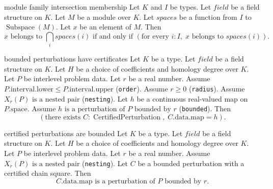 \begin{cleanresult}{module family intersection membership}
Let $K$ and $I$ be types.
Let $\mathit{field}$ be a field structure on $K$.
Let $M$ be a module over $K$.
Let $\mathit{spaces}$ be a function from $I$ to $\operatorname{Subspace}(M)$.
Let $x$ be an element of $M$.
Then \[x\text{ belongs to }\bigcap_i \mathit{spaces}(i)\text{ if and only if }\left(\text{for every }i : I,\; x\text{ belongs to }\mathit{spaces}(i)\right).\]
\par{}
\end{cleanresult}

\begin{cleanresult}{bounded perturbations have certificates}
Let $K$ be a type.
Let $\mathit{field}$ be a field structure on $K$.
Let $H$ be a choice of coefficients and homology degree over $K$.
Let $P$ be interlevel problem data.
Let $r$ be a real number.
Assume $P.\mathrm{interval}.\mathrm{lower}\le P.\mathrm{interval}.\mathrm{upper}$ (\texttt{order}).
Assume $r\ge 0$ (\texttt{radius}).
Assume $X_{r}(P)\text{ is a nested pair}$ (\texttt{nesting}).
Let $h$ be a continuous real-valued map on $P.\mathrm{space}$.
Assume $h\text{ is a perturbation of }P\text{ bounded by }r$ (\texttt{bounded}).
Then \[\left(\text{there exists }C : \operatorname{CertifiedPerturbation},\; C.\mathrm{data}.\mathrm{map}=h\right).\]
\par{}
\end{cleanresult}

\begin{cleanresult}{certified perturbations are bounded}
Let $K$ be a type.
Let $\mathit{field}$ be a field structure on $K$.
Let $H$ be a choice of coefficients and homology degree over $K$.
Let $P$ be interlevel problem data.
Let $r$ be a real number.
Assume $X_{r}(P)\text{ is a nested pair}$ (\texttt{nesting}).
Let $C$ be a bounded perturbation with a certified chain square.
Then \[C.\mathrm{data}.\mathrm{map}\text{ is a perturbation of }P\text{ bounded by }r.\]
\end{cleanresult}

